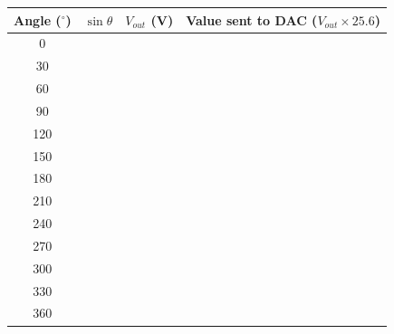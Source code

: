 \begin{procedure}
  \needspace{4cm}
  \begin{boxedtable}
    \label{tab:exp10-sine}
    {\renewcommand{\arraystretch}{1.5}
      \centering
      \begin{tabular}{cccc}
        \toprule
        Angle ($^\circ$) & $\sin\theta$ & $V_{out}$ (V) & Value sent to DAC ($V_{out}\times 25.6$) \\
        \midrule
        0                &              &               &                                          \\
        30               &              &               &                                          \\
        60               &              &               &                                          \\
        90               &              &               &                                          \\
        120              &              &               &                                          \\
        150              &              &               &                                          \\
        180              &              &               &                                          \\
        210              &              &               &                                          \\
        240              &              &               &                                          \\
        270              &              &               &                                          \\
        300              &              &               &                                          \\
        330              &              &               &                                          \\
        360              &              &               &                                          \\
        \bottomrule
      \end{tabular}
    }
  \end{boxedtable}

\end{procedure}

